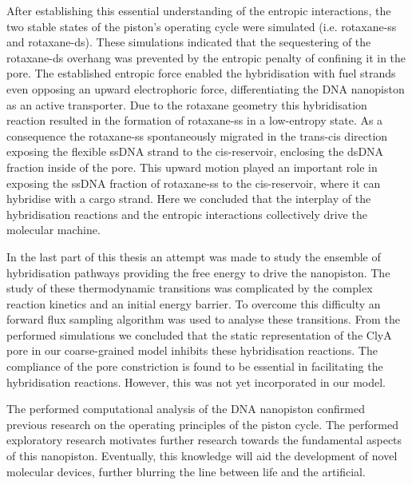 After establishing this essential understanding of the entropic interactions, the two
stable states of the piston's operating cycle were simulated (i.e. rotaxane-ss and
rotaxane-ds). These simulations indicated that the sequestering of the rotaxane-ds
overhang was prevented by the entropic penalty of confining it in the pore.
The established entropic force enabled the hybridisation with fuel strands even opposing
an upward electrophoric force, differentiating the DNA nanopiston as an active
transporter. Due to the rotaxane geometry this hybridisation reaction resulted in the
formation of rotaxane-ss in a low-entropy state. As a consequence the rotaxane-ss
spontaneously migrated in the trans-cis direction exposing the flexible ssDNA strand to
the cis-reservoir, enclosing the dsDNA fraction inside of the pore. This
upward motion played an important role in exposing the ssDNA fraction of rotaxane-ss to
the cis-reservoir, where it can hybridise with a cargo strand. Here we concluded that
the interplay of the hybridisation reactions and the entropic interactions collectively
drive the molecular machine.

In the last part of this thesis an attempt was made to study the ensemble of
hybridisation pathways providing the free energy to drive the nanopiston. The study of
these thermodynamic transitions was complicated by the complex reaction kinetics and an
initial energy barrier. To overcome this difficulty an forward flux sampling algorithm
was used to analyse these transitions. From the performed simulations we concluded that
the static representation of the ClyA pore in our coarse-grained model inhibits these
hybridisation reactions. The compliance of the pore constriction is found to be essential
in facilitating the hybridisation reactions. However, this was not yet incorporated in
our model.

The performed computational analysis of the DNA nanopiston confirmed previous research on
the operating principles of the piston cycle. The performed exploratory research
motivates further research towards the fundamental aspects of this nanopiston.
Eventually, this knowledge will aid the development of novel molecular devices, further
blurring the line between life and the artificial.
